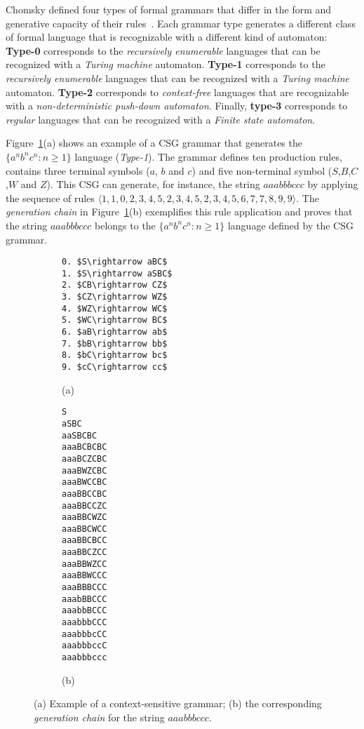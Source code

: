 \documentclass[letterpaper]{article} %
\newcommand{\tup}[1]{{\langle #1 \rangle}}
\begin{document}
Chomsky defined four types of formal grammars that differ in the form and generative capacity of their rules~\cite{chomsky2002syntactic}. Each grammar type generates a different class of formal language that is recognizable with a different kind of automaton: {\bf Type-0} corresponds to the {\em recursively enumerable} languages that can be recognized with a {\em Turing machine} automaton. {\bf Type-1} corresponds to the {\em recursively enumerable} languages that can be recognized with a {\em Turing machine} automaton. {\bf Type-2} corresponds to {\em context-free} languages that are recognizable with a {\em non-deterministic push-down automaton}. Finally, {\bf type-3} corresponds to {\em regular} languages that can be recognized with a {\em Finite state automaton}.

Figure~\ref{fig:csg}(a) shows an example of a CSG grammar that generates the $\{a^nb^nc^n : n \geq 1 \}$ language ({\em Type-1}). The grammar defines ten production rules, contains three terminal symbols ($a$, $b$ and $c$) and five non-terminal symbol ($S$,$B$,$C$,$W$ and $Z$). This CSG can generate, for instance, the string $aaabbbccc$ by applying the sequence of rules $\tup{1,1,0,2,3,4,5,2,3,4,5,2,3,4,5,6,7,7,8,9,9}$. The {\it generation chain} in Figure~\ref{fig:csg}(b) exemplifies this rule application and proves that the string $aaabbbccc$ belongs to the $\{a^nb^nc^n : n \geq 1 \}$ language defined by the CSG grammar.

\begin{figure}
    \begin{subfigure}[]{0.3\textwidth}
      \begin{lstlisting}
0. $S\rightarrow aBC$
1. $S\rightarrow aSBC$
2. $CB\rightarrow CZ$
3. $CZ\rightarrow WZ$
4. $WZ\rightarrow WC$
5. $WC\rightarrow BC$
6. $aB\rightarrow ab$
7. $bB\rightarrow bb$	
8. $bC\rightarrow bc$
9. $cC\rightarrow cc$     
      \end{lstlisting}

	\hspace*{1.8cm}(a)
  \end{subfigure}
  \begin{tiny}  
  \begin{subfigure}[]{0.15\textwidth}
    \begin{lstlisting}
S
aSBC
aaSBCBC
aaaBCBCBC
aaaBCZCBC
aaaBWZCBC
aaaBWCCBC
aaaBBCCBC
aaaBBCCZC
aaaBBCWZC
aaaBBCWCC
aaaBBCBCC
aaaBBCZCC
aaaBBWZCC
aaaBBWCCC
aaaBBBCCC
aaabBBCCC
aaabbBCCC
aaabbbCCC
aaabbbcCC
aaabbbccC
aaabbbccc 
\end{lstlisting}
	\hspace*{.3cm}(b)
  \end{subfigure}
  \end{tiny}    
  \caption{\small (a) Example of a context-sensitive grammar; (b) the corresponding {\it generation chain} for the string $aaabbbccc$.}
  \label{fig:csg}
\end{figure}
\end{document}
